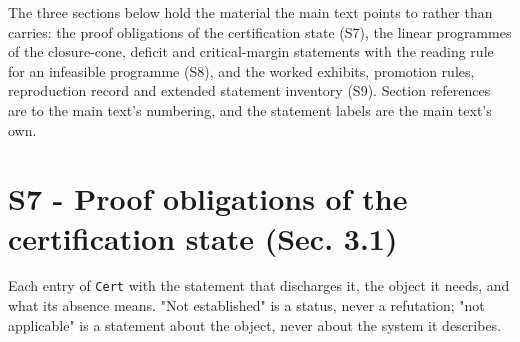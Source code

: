 \documentclass[11pt]{article}
\begin{document}
\vspace{0.8em}

The three sections below hold the material the main text points to rather than carries: the proof obligations of the certification state (S7), the linear programmes of the closure-cone, deficit and critical-margin statements with the reading rule for an infeasible programme (S8), and the worked exhibits, promotion rules, reproduction record and extended statement inventory (S9). Section references are to the main text's numbering, and the statement labels are the main text's own.

\section*{S7 - Proof obligations of the certification state (Sec. 3.1)}\label{s7---proof-obligations-of-the-certification-state-sec-31}

Each entry of \texttt{Cert} with the statement that discharges it, the object it needs, and what its absence means. "Not established" is a status, never a refutation; "not applicable" is a statement about the object, never about the system it describes.
\end{document}
